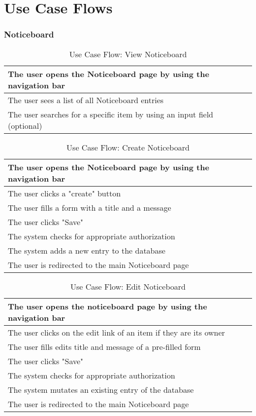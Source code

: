 \chapter{Use Case Flows} \label{ch:flows}
\subsection{Noticeboard}
\begin{table}[H]
  \begin{tabularx}{\linewidth}{|X|}
    \hline
     The user opens the Noticeboard page by using the navigation bar \\
     \hline
     The user sees a list of all Noticeboard entries \\
     \hline
     The user searches for a specific item by using an input field (optional) \\
     \hline 
  \end{tabularx}
  \caption{Use Case Flow: View Noticeboard}
\end{table}

\begin{table}[H]
    \begin{tabularx}{\linewidth}{|X|}
      \hline
       The user opens the Noticeboard page by using the navigation bar \\
       \hline
       The user clicks a "create" button \\
       \hline
       The user fills a form with a title and a message \\
       \hline
       The user clicks "Save" \\
       \hline
       The system checks for appropriate authorization \\
       \hline
       The system adds a new entry to the database \\
       \hline
       The user is redirected to the main Noticeboard page \\
       \hline 
    \end{tabularx}
    \caption{Use Case Flow: Create Noticeboard}
  \end{table}

  \begin{table}[H]
    \begin{tabularx}{\linewidth}{|X|}
      \hline
       The user opens the noticeboard page by using the navigation bar \\
       \hline
       The user clicks on the edit link of an item if they are its owner \\
       \hline
       The user fills edits title and message of a pre-filled form  \\
       \hline
       The user clicks "Save" \\
       \hline
       The system checks for appropriate authorization \\
       \hline
       The system mutates an existing entry of the database \\
       \hline
       The user is redirected to the main Noticeboard page \\
       \hline 
    \end{tabularx}
    \caption{Use Case Flow: Edit Noticeboard}
  \end{table}

